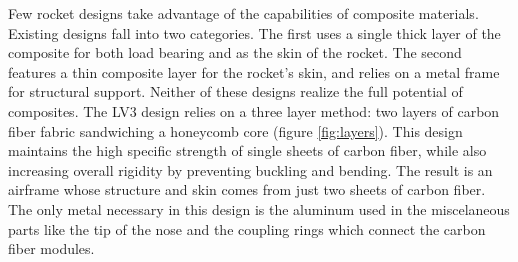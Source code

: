 \documentclass{aiaa-tc}%
\begin{document}
Few rocket designs take advantage of the capabilities of composite materials. Existing designs fall into two categories. The first uses a single thick layer of the composite for both load bearing and as the skin of the rocket. The second features a thin composite layer for the rocket's skin, and relies on a metal frame for structural support. 
Neither of these designs realize the full potential of composites. The LV3 design relies on a three layer method: two layers of carbon fiber fabric sandwiching a honeycomb core (figure \ref{fig:layers}). This design maintains the high specific strength of single sheets of carbon fiber, while also increasing overall rigidity by preventing buckling and bending. 
The result is an airframe whose structure and skin comes from just two sheets of carbon fiber. The only metal necessary in this design is the aluminum used in the miscelaneous parts like the tip of the nose and the coupling rings which connect the carbon fiber modules. 

\end{document}
